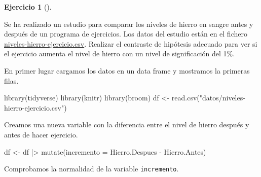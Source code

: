 \documentclass[
  spanish,
  a4paper,
]{scrreport}
\newenvironment{Shaded}{\begin{snugshade}}{\end{snugshade}}
\newcommand{\AttributeTok}[1]{\textcolor[rgb]{0.40,0.45,0.13}{#1}}
\newcommand{\FunctionTok}[1]{\textcolor[rgb]{0.28,0.35,0.67}{#1}}
\newcommand{\NormalTok}[1]{\textcolor[rgb]{0.00,0.23,0.31}{#1}}
\newcommand{\OtherTok}[1]{\textcolor[rgb]{0.00,0.23,0.31}{#1}}
\newcommand{\SpecialCharTok}[1]{\textcolor[rgb]{0.37,0.37,0.37}{#1}}
\newcommand{\StringTok}[1]{\textcolor[rgb]{0.13,0.47,0.30}{#1}}
\theoremstyle{definition}
\newtheorem{exercise}{Ejercicio}[chapter]
\theoremstyle{remark}
\begin{document}
\begin{exercise}[]\protect\hypertarget{exr-contraste-comparacion-medias-pareadas-hierro}{}\label{exr-contraste-comparacion-medias-pareadas-hierro}

Se ha realizado un estudio para comparar los niveles de hierro en sangre
antes y después de un programa de ejercicios. Los datos del estudio
están en el fichero
\href{datos/niveles-hierro-ejercicio.csv}{niveles-hierro-ejercicio.csv}.
Realizar el contraste de hipótesis adecuado para ver si el ejercicio
aumenta el nivel de hierro con un nivel de significación del 1\%.

\end{exercise}

\begin{tcolorbox}[enhanced jigsaw, arc=.35mm, bottomrule=.15mm, bottomtitle=1mm, breakable, colback=white, colbacktitle=quarto-callout-tip-color!10!white, colframe=quarto-callout-tip-color-frame, coltitle=black, left=2mm, leftrule=.75mm, opacityback=0, opacitybacktitle=0.6, rightrule=.15mm, title=\textcolor{quarto-callout-tip-color}{\faLightbulb}\hspace{0.5em}{Solución}, titlerule=0mm, toprule=.15mm, toptitle=1mm]

En primer lugar cargamos los datos en un data frame y mostramos la
primeras filas.

\begin{Shaded}
\begin{Highlighting}[]
\FunctionTok{library}\NormalTok{(tidyverse)}
\FunctionTok{library}\NormalTok{(knitr)}
\FunctionTok{library}\NormalTok{(broom)}
\NormalTok{df }\OtherTok{\textless{}{-}} \FunctionTok{read.csv}\NormalTok{(}\StringTok{"datos/niveles{-}hierro{-}ejercicio.csv"}\NormalTok{)}
\end{Highlighting}
\end{Shaded}

Creamos una nueva variable con la diferencia entre el nivel de hierro
después y antes de hacer ejercicio.

\begin{Shaded}
\begin{Highlighting}[]
\NormalTok{df }\OtherTok{\textless{}{-}}\NormalTok{ df }\SpecialCharTok{|\textgreater{}} 
    \FunctionTok{mutate}\NormalTok{(}\AttributeTok{incremento =}\NormalTok{ Hierro.Despues }\SpecialCharTok{{-}}\NormalTok{ Hierro.Antes)}
\end{Highlighting}
\end{Shaded}

Comprobamos la normalidad de la variable \texttt{incremento}.


\end{tcolorbox}
\end{document}
